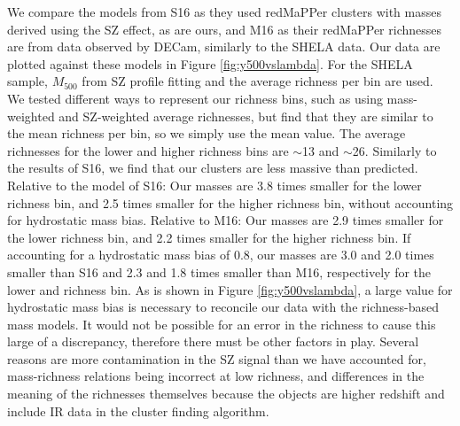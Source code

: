 \documentclass[a4paper,fleqn,usenatbib]{mnras}
\begin{document}
We compare the models from S16 as they used redMaPPer clusters with masses derived using the SZ effect, as are ours, and M16 as their redMaPPer richnesses are from data observed by DECam, similarly to the SHELA data. Our data are plotted against these models in Figure \ref{fig:y500vslambda}. For the SHELA sample, $M_{500}$ from SZ profile fitting and the average richness per bin are used. We tested different ways to represent our richness bins, such as using mass-weighted and SZ-weighted average richnesses, but find that they are similar to the mean richness per bin, so we simply use the mean value. The average richnesses for the lower and higher richness bins are $\sim$13 and $\sim$26. Similarly to the results of S16, we find that our clusters are less massive than predicted. Relative to the model of S16: Our masses are 3.8 times smaller for the lower richness bin, and 2.5 times smaller for the higher richness bin, without accounting for hydrostatic mass bias. Relative to M16: Our masses are 2.9 times smaller for the lower richness bin, and 2.2 times smaller for the higher richness bin. If accounting for a hydrostatic mass bias of 0.8, our masses are 3.0 and 2.0 times smaller than S16 and 2.3 and 1.8 times smaller than M16, respectively for the lower and richness bin.
As is shown in Figure \ref{fig:y500vslambda}, a large value for hydrostatic mass bias is necessary to reconcile our data with the richness-based mass models. It would not be possible for an error in the richness to cause this large of a discrepancy, therefore there must be other factors in play. Several reasons are more contamination in the SZ signal than we have accounted for, mass-richness relations being incorrect at low richness, and differences in the meaning of the richnesses themselves because the objects are higher redshift and include IR data in the cluster finding algorithm.


\end{document}
